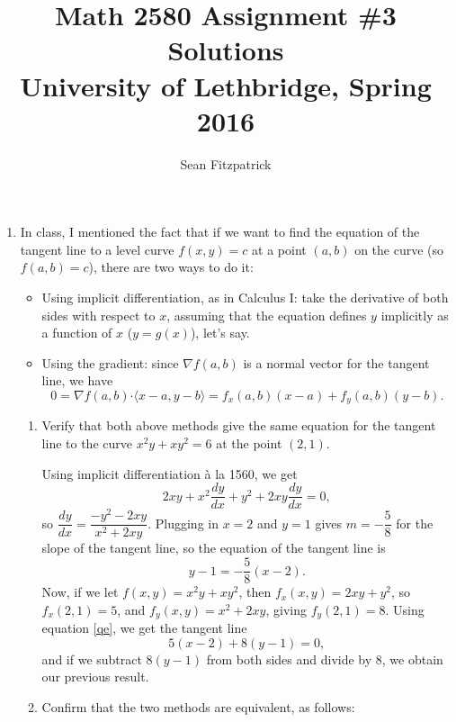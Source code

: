 \documentclass[letterpaper,12pt]{article}
\title{Math 2580 Assignment \#3 Solutions\\University of Lethbridge, Spring 2016}
\author{Sean Fitzpatrick}
\newcommand{\dotp}{\boldsymbol{\cdot}}
\begin{document}
 \maketitle

\begin{enumerate}
 \item In class, I mentioned the fact that if we want to find the equation of the tangent line to a level curve $f(x,y)=c$ at a point $(a,b)$ on the curve (so $f(a,b)=c$), there are two ways to do it:
\begin{itemize}
 \item Using implicit differentiation, as in Calculus I: take the derivative of both sides with respect to $x$, assuming that the equation defines $y$ implicitly as a function of $x$ ($y=g(x)$), let's say.
 \item Using the gradient: since $\nabla f(a,b)$ is a normal vector for the tangent line, we have 
\begin{equation}\label{qe}
 0=\nabla f(a,b)\dotp \langle x-a, y-b\rangle = f_x(a,b)(x-a)+f_y(a,b)(y-b).
\end{equation}
\end{itemize}
\begin{enumerate}
 \item Verify that both above methods give the same equation for the tangent line to the curve $x^2y+xy^2=6$ at the point $(2,1)$.

\bigskip

Using implicit differentiation \`a la 1560, we get
\[
 2xy+x^2\frac{dy}{dx}+y^2+2xy\frac{dy}{dx} = 0,
\]
so $\dfrac{dy}{dx} = \dfrac{-y^2-2xy}{x^2+2xy}$. Plugging in $x=2$ and $y=1$ gives $m = -\dfrac{5}{8}$ for the slope of the tangent line, so the equation of the tangent line is
\[
 y-1 = -\frac{5}{8}(x-2).
\]
Now, if we let $f(x,y)=x^2y+xy^2$, then $f_x(x,y) = 2xy+y^2$, so $f_x(2,1) = 5$, and $f_y(x,y) = x^2+2xy$, giving $f_y(2,1) = 8$. Using equation \eqref{qe}, we get the tangent line
\[
 5(x-2)+8(y-1)=0,
\]
and if we subtract $8(y-1)$ from both sides and divide by 8, we obtain our previous result.

 \item Confirm that the two methods are equivalent, as follows:


\end{enumerate}
\end{enumerate}
\end{document}
